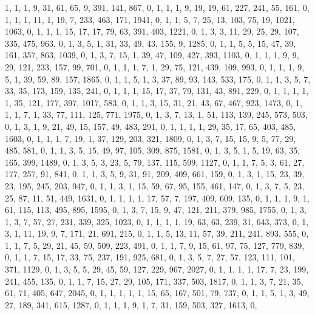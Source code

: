 \begin{code}
\begin{hide}
{     {1, 1, 1, 9, 31, 61, 65, 9, 391, 141, 867, 0},
     {1, 1, 1, 9, 19, 19, 61, 227, 241, 55, 161, 0},
     {1, 1, 1, 11, 1, 19, 7, 233, 463, 171, 1941, 0},
     {1, 1, 5, 7, 25, 13, 103, 75, 19, 1021, 1063, 0},
     {1, 1, 1, 15, 17, 17, 79, 63, 391, 403, 1221, 0},
     {1, 3, 3, 11, 29, 25, 29, 107, 335, 475, 963, 0},
     {1, 3, 5, 1, 31, 33, 49, 43, 155, 9, 1285, 0},
     {1, 1, 5, 5, 15, 47, 39, 161, 357, 863, 1039, 0},
     {1, 3, 7, 15, 1, 39, 47, 109, 427, 393, 1103, 0},
     {1, 1, 1, 9, 9, 29, 121, 233, 157, 99, 701, 0},
     {1, 1, 1, 7, 1, 29, 75, 121, 439, 109, 993, 0},
     {1, 1, 1, 9, 5, 1, 39, 59, 89, 157, 1865, 0},
     {1, 1, 5, 1, 3, 37, 89, 93, 143, 533, 175, 0},
     {1, 1, 3, 5, 7, 33, 35, 173, 159, 135, 241, 0},
     {1, 1, 1, 15, 17, 37, 79, 131, 43, 891, 229, 0},
     {1, 1, 1, 1, 1, 35, 121, 177, 397, 1017, 583, 0},
     {1, 1, 3, 15, 31, 21, 43, 67, 467, 923, 1473, 0},
     {1, 1, 1, 7, 1, 33, 77, 111, 125, 771, 1975, 0},
     {1, 3, 7, 13, 1, 51, 113, 139, 245, 573, 503, 0},
     {1, 3, 1, 9, 21, 49, 15, 157, 49, 483, 291, 0},
     {1, 1, 1, 1, 29, 35, 17, 65, 403, 485, 1603, 0},
     {1, 1, 1, 7, 19, 1, 37, 129, 203, 321, 1809, 0},
     {1, 3, 7, 15, 15, 9, 5, 77, 29, 485, 581, 0},
     {1, 1, 3, 5, 15, 49, 97, 105, 309, 875, 1581, 0},
     {1, 3, 5, 1, 5, 19, 63, 35, 165, 399, 1489, 0},
     {1, 3, 5, 3, 23, 5, 79, 137, 115, 599, 1127, 0},
     {1, 1, 7, 5, 3, 61, 27, 177, 257, 91, 841, 0},
     {1, 1, 3, 5, 9, 31, 91, 209, 409, 661, 159, 0},
     {1, 3, 1, 15, 23, 39, 23, 195, 245, 203, 947, 0},
     {1, 1, 3, 1, 15, 59, 67, 95, 155, 461, 147, 0},
     {1, 3, 7, 5, 23, 25, 87, 11, 51, 449, 1631, 0},
     {1, 1, 1, 1, 17, 57, 7, 197, 409, 609, 135, 0},
     {1, 1, 1, 9, 1, 61, 115, 113, 495, 895, 1595, 0},
     {1, 3, 7, 15, 9, 47, 121, 211, 379, 985, 1755, 0},
     {1, 3, 1, 3, 7, 57, 27, 231, 339, 325, 1023, 0},
     {1, 1, 1, 1, 19, 63, 63, 239, 31, 643, 373, 0},
     {1, 3, 1, 11, 19, 9, 7, 171, 21, 691, 215, 0},
     {1, 1, 5, 13, 11, 57, 39, 211, 241, 893, 555, 0},
     {1, 1, 7, 5, 29, 21, 45, 59, 509, 223, 491, 0},
     {1, 1, 7, 9, 15, 61, 97, 75, 127, 779, 839, 0},
     {1, 1, 7, 15, 17, 33, 75, 237, 191, 925, 681, 0},
     {1, 3, 5, 7, 27, 57, 123, 111, 101, 371, 1129, 0},
     {1, 3, 5, 5, 29, 45, 59, 127, 229, 967, 2027, 0},
     {1, 1, 1, 1, 17, 7, 23, 199, 241, 455, 135, 0},
     {1, 1, 7, 15, 27, 29, 105, 171, 337, 503, 1817, 0},
     {1, 1, 3, 7, 21, 35, 61, 71, 405, 647, 2045, 0},
     {1, 1, 1, 1, 1, 15, 65, 167, 501, 79, 737, 0},
     {1, 1, 5, 1, 3, 49, 27, 189, 341, 615, 1287, 0},
     {1, 1, 1, 9, 1, 7, 31, 159, 503, 327, 1613, 0},
}
\end{hide}
\end{code}
